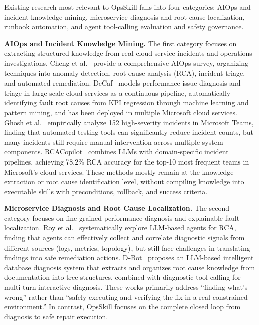 \documentclass[conference,10pt]{IEEEtran}
\begin{document}
Existing research most relevant to OpsSkill falls into four categories: AIOps and incident knowledge mining, microservice diagnosis and root cause localization, runbook automation, and agent tool-calling evaluation and safety governance.

\textbf{AIOps and Incident Knowledge Mining.}
The first category focuses on extracting structured knowledge from real cloud service incidents and operations investigations.
Cheng et al.~\cite{cheng2023aiops} provide a comprehensive AIOps survey, organizing techniques into anomaly detection, root cause analysis (RCA), incident triage, and automated remediation.
DeCaf~\cite{bansal2020decaf} models performance issue diagnosis and triage in large-scale cloud services as a continuous pipeline, automatically identifying fault root causes from KPI regression through machine learning and pattern mining, and has been deployed in multiple Microsoft cloud services.
Ghosh et al.~\cite{ghosh2022incidents} empirically analyze 152 high-severity incidents in Microsoft Teams, finding that automated testing tools can significantly reduce incident counts, but many incidents still require manual intervention across multiple system components.
RCACopilot~\cite{chen2024rcacopilot} combines LLMs with domain-specific incident pipelines, achieving 78.2\% RCA accuracy for the top-10 most frequent teams in Microsoft's cloud services.
These methods mostly remain at the knowledge extraction or root cause identification level, without compiling knowledge into executable skills with preconditions, rollback, and success criteria.

\textbf{Microservice Diagnosis and Root Cause Localization.}
The second category focuses on fine-grained performance diagnosis and explainable fault localization.
Roy et al.~\cite{roy2024rca_agents} systematically explore LLM-based agents for RCA, finding that agents can effectively collect and correlate diagnostic signals from different sources (logs, metrics, topology), but still face challenges in translating findings into safe remediation actions.
D-Bot~\cite{zhou2023dbot} proposes an LLM-based intelligent database diagnosis system that extracts and organizes root cause knowledge from documentation into tree structures, combined with diagnostic tool calling for multi-turn interactive diagnosis.
These works primarily address ``finding what's wrong'' rather than ``safely executing and verifying the fix in a real constrained environment.''
In contrast, OpsSkill focuses on the complete closed loop from diagnosis to safe repair execution.
\end{document}
